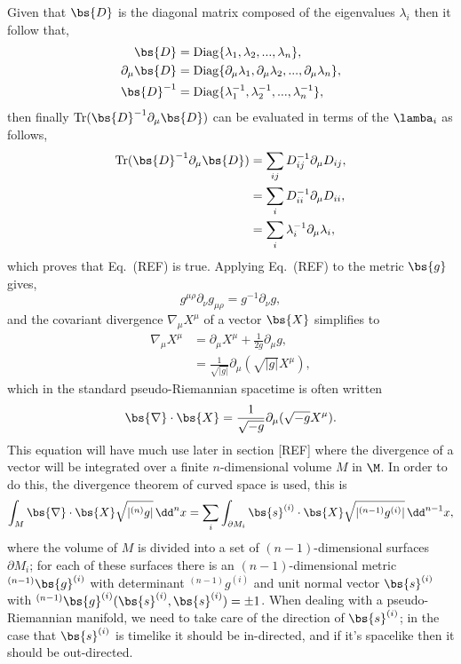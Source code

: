 Given that $\bs{D}$ is the diagonal matrix composed of the eigenvalues $\lambda_i$ then it follow that,
\begin{align}
\bs{D} &= \mathrm{Diag}\{\lambda_1,\lambda_2,...,\lambda_n\} ,\\
\partial_\mu\bs{D} &= \mathrm{Diag}\{\partial_\mu\lambda_1,\partial_\mu\lambda_2,...,\partial_\mu\lambda_n\} ,\\
\bs{D}^{-1} &= \mathrm{Diag}\{\lambda^{-1}_1,\lambda^{-1}_2,...,\lambda^{-1}_n\} ,
\end{align}
then finally $\mathrm{Tr}(\bs{D}^{-1} \partial_\mu \bs{D})$ can be evaluated in terms of the $\lamba_i$ as follows,
\begin{align}
\mathrm{Tr}(\bs{D}^{-1} \partial_\mu \bs{D}) &= \sum_{ij} D^{-1}_{ij} \partial_\mu D_{ij} ,\\
&= \sum_i D^{-1}_{ii} \partial_\mu D_{ii} ,\\
&= \sum_i \lambda_i^{-1} \partial_\mu \lambda_i,
\end{align}
which proves that Eq.~(REF) is true. Applying Eq.~(REF) to the metric $\bs{g}$ gives,
\begin{equation}
g^{\mu\rho}\partial_\nu g_{\mu\rho} = g^{-1} \partial_\nu g,
\end{equation}
and the covariant divergence $\nabla_\mu X^\mu$ of a vector $\bs{X}$ simplifies to 
\begin{align}
\nabla_\mu X^\mu &= \partial_\mu X^\mu + \frac{1}{2g}\partial_\mu g ,\\
&= \frac{1}{\sqrt{|g|}}\partial_\mu (\sqrt{|g|}X^\mu),
\end{align}
which in the standard pseudo-Riemannian spacetime is often written
\begin{equation}
\bs{\nabla}\cdot \bs{X} = \frac{1}{\sqrt{-g}}\partial_\mu (\sqrt{-g}X^\mu).
\end{equation}
This equation will have much use later in section [REF] where the divergence of a vector will be integrated over a finite $n$-dimensional volume $M$ in $\M$. In order to do this, the divergence theorem of curved space is used, this is 
\begin{equation}
\int_M \bs{\nabla} \cdot \bs{X} \sqrt{|{}^{(n)}g|} \,\dd^n x = \sum_i \int_{\partial M_i} \bs{s}^{(i)} \cdot \bs{X} \sqrt{|{}^{(n-1)}g^{(i)}|} \,\dd^{n-1} x,
\end{equation}
where the volume of $M$ is divided into a set of $(n-1)$-dimensional surfaces $\partial M_i$; for each of these surfaces there is an $(n-1)$-dimensional metric ${}^{(n-1)}\bs{g}^{(i)}$ with determinant ${}^{(n-1)} g ^{(i)}$ and unit normal vector $\bs{s}^{(i)}$ with ${}^{(n-1)}\bs{g}^{(i)}(\bs{s}^{(i)},\bs{s}^{(i)})=\pm 1$. When dealing with a pseudo-Riemannian manifold, we need to take care of the direction of $\bs{s}^{(i)}$; in the case that $\bs{s}^{(i)}$ is timelike it should be in-directed, and if it's spacelike then it should be out-directed. 

